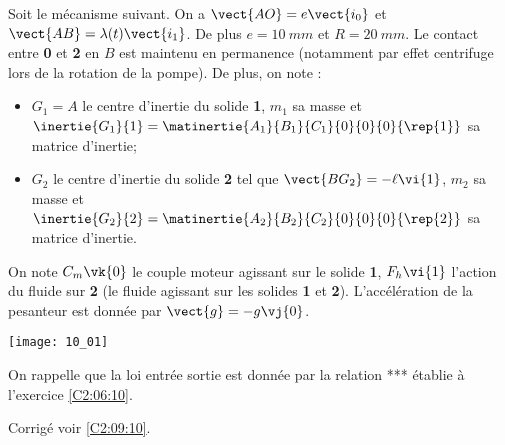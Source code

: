 \normaltrue \difficilefalse \tdifficilefalse
\correctionfalse


\setcounter{question}{0}
\ifcorrection
\else
{}
\fi

\ifprof
\else
Soit le mécanisme suivant. On a $\vect{AO}=e\vect{i_0}$ et $\vect{AB}=\lambda(t)\vect{i_1}$. De plus $e=\SI{10}{mm}$ et $R=\SI{20}{mm}$. Le contact entre \textbf{0} et \textbf{2} en $B$ est maintenu en permanence (notamment par effet centrifuge lors de la rotation de la pompe). De plus, on note :
\begin{itemize}
\item $G_1 = A$ le centre d'inertie du solide \textbf{1}, $m_1$ sa masse et $\inertie{G_1}{1}=\matinertie{A_1}{B_1}{C_1}{0}{0}{0}{\rep{1}}$ sa matrice d'inertie;
\item $G_2$ le centre d'inertie du solide \textbf{2} tel que $\vect{BG_2}=-\ell \vi{1}$, $m_2$ sa masse et $\inertie{G_2}{2}=\matinertie{A_2}{B_2}{C_2}{0}{0}{0}{\rep{2}}$ sa matrice d'inertie.
\end{itemize}
On note $C_m\vk{0}$ le couple moteur agissant sur le solide \textbf{1}, $F_h\vi{1}$ l'action du fluide sur \textbf{2} (le fluide agissant sur les solides \textbf{1} et \textbf{2}).  L'accélération de la pesanteur est donnée par $\vect{g}=-g\vj{0}$.

\begin{center}
\texttt{[image: 10\_01]}
\end{center}
\fi

On rappelle que la loi entrée sortie est donnée par la relation *** établie à l'exercice \ref{C2:06:10}.

\ifprof
\else
\fi

\ifprof
\else
\fi

\ifprof
\else
\fi

\ifprof
\else
\fi

\ifprof
\else
\fi


\ifprof
\else
\begin{flushright}
\footnotesize{Corrigé  voir \ref{C2:09:10}.}
\end{flushright}%
\fi